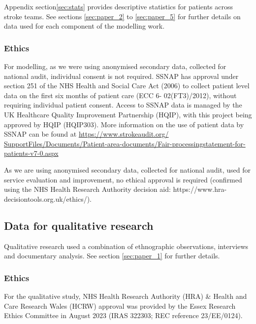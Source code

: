 Appendix section\ref{sec:stats} provides descriptive statistics for patients across stroke teams. See sections \ref{sec:paper_2} to \ref{sec:paper_5} for further details on data used for each component of the modelling work.



\subsubsection{Ethics}

For modelling, as we were using anonymised secondary data, collected for national audit, individual consent is not required. SSNAP has approval under section 251 of the NHS Health and Social Care Act (2006) to collect patient level data on the first six months of patient care (ECC 6- 02(FT3)/2012), without requiring individual patient consent. Access to SSNAP data is managed by the UK Healthcare Quality Improvement Partnership (HQIP), with this project being approved by HQIP (HQIP303). More information on the use of patient data by SSNAP can be found at \url{https://www.strokeaudit.org/ SupportFiles/Documents/Patient-area-documents/Fair-processingstatement-for-patients-v7-0.aspx}

As we are using anonymised secondary data, collected for national audit, used for service evaluation and improvement, no ethical approval is required (confirmed using the NHS Health Research Authority decision aid: https://www.hra-decisiontools.org.uk/ethics/).

\subsection{Data for qualitative research}

Qualitative research used a combination of ethnographic observations, interviews and documentary analysis. See section \ref{sec:paper_1} for further details.

\subsubsection{Ethics}

For the qualitative study, NHS Health Research Authority (HRA) \& Health and Care Research Wales (HCRW) approval was provided by the Essex Research Ethics Committee in August 2023 (IRAS 322303; REC reference 23/EE/0124).